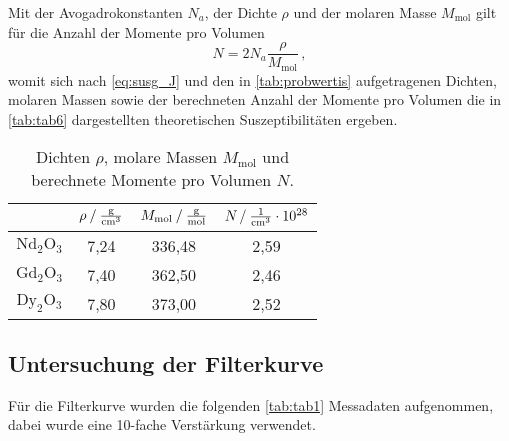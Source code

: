 Mit der Avogadrokonstanten $N_a$, der Dichte $\rho$ und der molaren Masse $M_\text{mol}$ gilt für die Anzahl der Momente pro Volumen
\begin{equation*}
    N = 2 N_a \dfrac{\rho}{M_\text{mol}} \,,
\end{equation*}
womit sich nach \eqref{eq:susg_J} und den in \autoref{tab:probwertis} aufgetragenen Dichten, molaren Massen sowie der berechneten Anzahl der Momente pro Volumen
die in \autoref{tab:tab6} dargestellten theoretischen Suszeptibilitäten ergeben.

\begin{table}[H]
    \centering
    \caption{Dichten $\rho$, molare Massen $M_\text{mol}$ und berechnete Momente pro Volumen $N$.}
    \label{tab:probwertis}
    \begin{tabular}{S S[table-format=1.2] S[table-format=3.2] S[table-format=1.2]}
      \toprule
      {} & {$\rho \mathbin{/} \unit{\frac{\gram}{{\centi\meter}^3}}$} & {$M_\text{mol} \mathbin{/} \unit{\frac{\gram}{\mol}}$} & {$N \mathbin{/} \unit{\frac{1}{{\centi\meter}^3}} \cdot 10^{28}$}  \\
      \midrule
      {$\text{Nd}_2\text{O}_3$}         &           7,24          &         336,48          &           2,59            \\
      {$\text{Gd}_2\text{O}_3$}         &           7,40          &         362,50          &           2,46            \\
      {$\text{Dy}_2\text{O}_3$}         &           7,80          &         373,00          &           2,52            \\
      \bottomrule
    \end{tabular}
\end{table}



\subsection{Untersuchung der Filterkurve}

Für die Filterkurve wurden die folgenden \autoref{tab:tab1} Messadaten aufgenommen, dabei wurde eine 10-fache Verstärkung verwendet.

